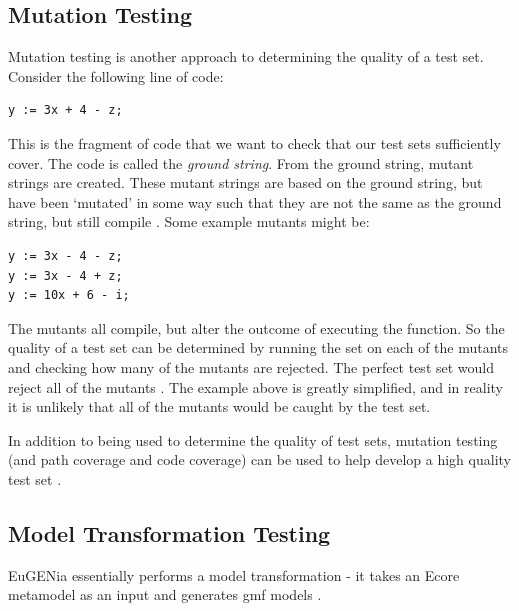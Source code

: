 \subsection{Mutation Testing}

Mutation testing is another approach to determining the quality of a test set. Consider the following line of code:

\begin{lstlisting}
y := 3x + 4 - z;
\end{lstlisting}

This is the fragment of code that we want to check that our test sets sufficiently cover. The code is called the \emph{ground string}. From the ground string, mutant strings are created. These mutant strings are based on the ground string, but have been `mutated' in some way such that they are not the same as the ground string, but still compile \citep{softwareTestingIntro}. Some example mutants might be:

\begin{lstlisting}
y := 3x - 4 - z;
y := 3x - 4 + z;
y := 10x + 6 - i;
\end{lstlisting}

The mutants all compile, but alter the outcome of executing the function. So the quality of a test set can be determined by running the set on each of the mutants and checking how many of the mutants are rejected. The perfect test set would reject all of the mutants \citep{softwareTestingIntro}. The example above is greatly simplified, and in reality it is unlikely that all of the mutants would be caught by the test set.

In addition to being used to determine the quality of test sets, mutation testing (and path coverage and code coverage) can be used to help develop a high quality test set \citep{softwareTestingIntro}.

\subsection{Model Transformation Testing}

EuGENia essentially performs a model transformation - it takes an Ecore metamodel as an input and generates gmf models \citep{eugeniaSite}. 



% 
